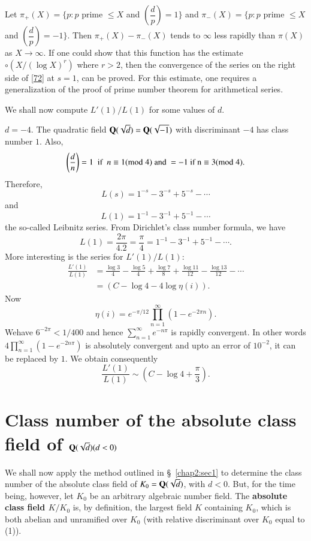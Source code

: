 Let $\pi_{+}(X)=\{p:p$ prime $\leq X$ and
$\left(\dfrac{d}{p}\right)=1\}$ and $\pi_{-}(X)=\{p:p$ prime $\leq X$
and $\left(\dfrac{d}{p}\right)=-1\}$. Then $\pi_{+}(X)-\pi_{-}(X)$
tends to $\infty$ less rapidly than $\pi(X)$ as $X\to \infty$. If one
could show that this function has the estimate $\circ (X/(\log X)^r)$ where
$r>2$, then the convergence of the series on the right side of
\eqref{72} at $s=1$, can be proved. For this estimate, one requires a
generalization of the proof of prime number theorem for arithmetical
series.

We shall now compute $L'(1)/L(1)$ for some values of $d$.

\begin{examples*}
$d=-4$. The quadratic field $\mathbf{Q}(\sqrt{d})=\mathbf{Q}(\sqrt{-1})$ with
  discriminant $-4$ has class number $1$. Also, 
$$
\left(\frac{d}{n}\right)=1 \text{ \ if \ } n\equiv 1 (\rm{mod} \; 4) \text{ and
}=-1\text{ if } n\equiv 3 (\rm{mod} \; 4).
$$
Therefore,
$$
L(s)=1^{-s}-3^{-s}+5^{-s}-\cdots
$$
and
$$
L(1)=1^{-1}-3^{-1}+5^{-1}-\cdots
$$
the so-called Leibnitz series. From Dirichlet's class number formula,
we have
$$
L(1)=\frac{2\pi}{4.2}=\frac{\pi}{4}=1^{-1}-3^{-1}+5^{-1}-\cdots.
$$
More interesting is the series for $L'(1)/L(1)$:
\begin{align*}
\frac{L'(1)}{L(1)} &= \frac{\log 3}{4}-\frac{\log 5}{4}+\frac{\log
  7}{8}+\frac{\log 11}{12}-\frac{\log 13}{12}-\cdots\\
&= (C-\log 4-4\log\eta(i)).
\end{align*}
Now
$$
\eta(i)=e^{-\pi/12}\prod^{\infty}_{n=1}(1-e^{-2\pi n}).
$$
We\pageoriginale have $6^{-2\pi}<1/400$ and hence
$\sum\limits^{\infty}_{n=1}e^{-n\pi}$ is rapidly convergent. In other
words $4\prod\limits^{\infty}_{n=1}(1-e^{-2n\pi})$ is absolutely
convergent and upto an error of $10^{-2}$, it can be replaced by
$1$. We obtain consequently
$$
\frac{L'(1)}{L(1)}\sim\left(C-\log 4+\frac{\pi}{3}\right).
$$
\end{examples*}

\section[Class number of the absolute class field of...]{Class number of the absolute class field of\hfil\break
  $\mathbf{Q}(\sqrt{d})(d<0)$}\label{chap2:sec2} %

We shall now apply the method outlined in \S\ \ref{chap2:sec1} to
determine the class number of the absolute class field of
$K_{0}=\mathbf{Q}(\sqrt{d})$, with $d<0$. But, for the time being, however,
let $K_{0}$ be an arbitrary algebraic number field. The {\bf absolute
  class field $K/K_{0}$} is, by definition, the largest field $K$
containing $K_{0}$, which is both abelian and unramified over $K_{0}$
(\ie with relative discriminant over $K_{0}$ equal to (1)).

